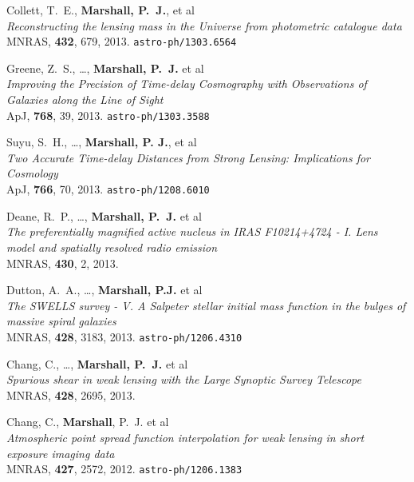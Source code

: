 \begin{revnumerate}

\item{Collett, T.~E., \textbf{Marshall, P.~J.}, et al\\
\textit{Reconstructing the lensing mass in the Universe from photometric catalogue data}\\
MNRAS, \textbf{432}, 679, 2013.
\texttt{astro-ph/1303.6564}
}

\item{Greene, Z.~S., \ldots, \textbf{Marshall, P.~J.} et al\\
\textit{Improving the Precision of Time-delay Cosmography with Observations of Galaxies along the Line of Sight}\\
ApJ, \textbf{768}, 39, 2013.
\texttt{astro-ph/1303.3588}
}

\item{Suyu, S.~H., \ldots, \textbf{Marshall, P. J.}, et al\\
\textit{Two Accurate Time-delay Distances from Strong Lensing: Implications for Cosmology}\\
ApJ, \textbf{766}, 70, 2013.
\texttt{astro-ph/1208.6010}
}

\item{{Deane}, R.~P., \ldots, \textbf{Marshall, P.~J.} et al\\
\textit{The preferentially magnified active nucleus in IRAS F10214+4724 - I. Lens model and spatially resolved radio emission}\\
MNRAS, \textbf{430}, 2, 2013.
}

\item{Dutton, A.~A., \ldots, \textbf{Marshall, P.J.} et al\\
\textit{The SWELLS survey - V. A Salpeter stellar initial mass function in the bulges of massive spiral galaxies}\\
MNRAS, \textbf{428}, 3183, 2013.
\texttt{astro-ph/1206.4310}
}

\item{Chang, C., \ldots, \textbf{Marshall, P.~J.} et al\\
\textit{Spurious shear in weak lensing with the Large Synoptic Survey Telescope}\\
MNRAS, \textbf{428}, 2695, 2013.
}

\item{{Chang}, C., \textbf{Marshall}, P.~J. et al\\
\textit{Atmospheric point spread function interpolation for weak lensing in short exposure imaging data}\\
MNRAS, \textbf{427}, 2572, 2012.
\texttt{astro-ph/1206.1383}
}


\end{revnumerate}
